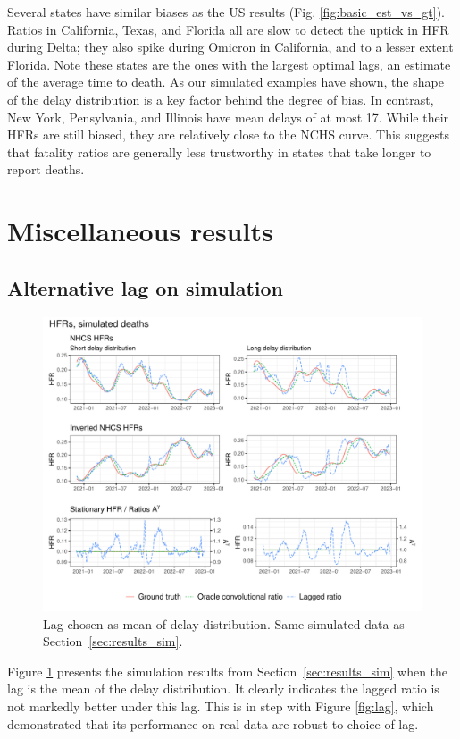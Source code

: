 \documentclass{article}
\begin{document}
Several states have similar biases as the US results (Fig. \ref{fig:basic_est_vs_gt}). Ratios in California, Texas, and Florida all are slow to detect the uptick in HFR during Delta; they also spike during Omicron in California, and to a lesser extent Florida. Note these states are the ones with the largest optimal lags, an estimate of the average time to death. As our simulated examples have shown, the shape of the delay distribution is a key factor behind the degree of bias. In contrast, New York, Pensylvania, and Illinois have mean delays of at most 17. While their HFRs are still biased, they are relatively close to the NCHS curve. This suggests that fatality ratios are generally less trustworthy in states that take longer to report deaths.

\section{Miscellaneous results}\label{apx:misc}
\subsection{Alternative lag on simulation}
\begin{figure}
    \centering
    \includegraphics[width=\linewidth]{Figures/Simulated/simulated_results_delay_mean.pdf}%
    \caption{Lag chosen as mean of delay distribution. Same simulated data as Section~\ref{sec:results_sim}.}
    \label{fig:sims_mean_lag}
\end{figure}

Figure \ref{fig:sims_mean_lag} presents the simulation results from Section~\ref{sec:results_sim} when the lag is the mean of the delay distribution. It clearly indicates the lagged ratio is not markedly better under this lag. This is in step with Figure \ref{fig:lag}, which demonstrated that its performance on real data are robust to choice of lag.
\end{document}
